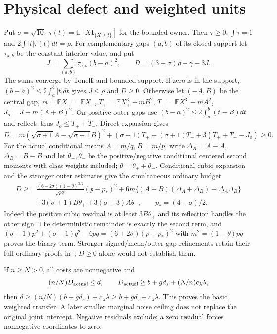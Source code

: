\documentclass[11pt,a4paper]{article}
\newcommand{\E}{\mathbb E}
\begin{document}
\section{Physical defect and weighted units}\label{app:resource}
Put $\sigma=\sqrt{10}$, $\tau(t)=\E[X\mathbf1_{\{X\ge t\}}]$ for the
bounded owner. Then $\tau\ge0$, $\int\tau=1$ and $2\int|t|\tau(t)dt=\rho$.
For complementary gaps $(a,b)$ of its closed support let $\tau_{a,b}$ be
the constant interior value, and put
\[
 J=\sum_{(a,b)}\tau_{a,b}(b-a)^2,\qquad D=(3+\sigma)\rho-\gamma-3J.
\]
The sums converge by Tonelli and bounded support. If zero is in the support,
$(b-a)^2\le2\int_a^b|t|dt$ gives $J\le\rho$ and $D\ge0$. Otherwise let
$(-A,B)$ be the central gap, $m=\E X_+=\E X_-$,
$T_+=\E X_+^3-mB^2$, $T_-=\E X_-^3-mA^2$, $J_o=J-m(A+B)^2$.
On positive outer gaps use $(b-a)^2\le2\int_a^b(t-B)dt$ and reflect;
thus $J_o\le T_++T_-$. Direct expansion gives
\[
 D=m(\sqrt{\sigma+1}A-\sqrt{\sigma-1}B)^2
 +(\sigma-1)T_++(\sigma+1)T_-+3(T_++T_--J_o)\ge0.
\]
For the actual conditional means $\bar A=m/q$, $\bar B=m/p$, write
$\Delta_A=\bar A-A$, $\Delta_B=\bar B-B$ and let $\theta_+,\theta_-$
be the positive/negative conditional centered second moments with class
weights included; $\theta=\theta_++\theta_-$. Conditional cubic expansion
and the stronger outer estimates give the simultaneous ordinary budget
\begin{align*}
 D\ge{}&\frac{(6+2\sigma)(1-\theta)^{3/2}}{\sqrt{pq}}(p-p_*)^2
 +6m\{(A+B)(\Delta_A+\Delta_B)+\Delta_A\Delta_B\}\\
 &+3(\sigma+1)B\theta_++3(\sigma+3)A\theta_-,\qquad p_*=(4-\sigma)/2.
\end{align*}
Indeed the positive cubic residual is at least $3B\theta_+$ and its
reflection handles the other sign. The deterministic remainder is exactly
the second term, and
$(\sigma+1)p^2+(\sigma-1)q^2-6pq=(6+2\sigma)(p-p_*)^2$ with
$m^2=(1-\theta)pq$ proves the binary term. Stronger signed/mean/outer-gap
refinements retain their full ordinary proofs in~\cite[lines2470--4039]{source};
$D\ge0$ alone would not establish them.

If $n\ge N>0$, all costs are nonnegative and
\[
 (n/N)D_{\rm actual}\le d,\qquad
 D_{\rm actual}\ge b+gd_s+(N/n)c_\lambda\lambda,
\]
then $d\ge(n/N)(b+gd_s)+c_\lambda\lambda\ge b+gd_s+c_\lambda\lambda$.
This proves the basic weighted transfer. A later smaller marginal noise
ceiling does not replace the original joint intercept. Negative residuals
exclude; a zero residual forces nonnegative coordinates to zero.
\end{document}
